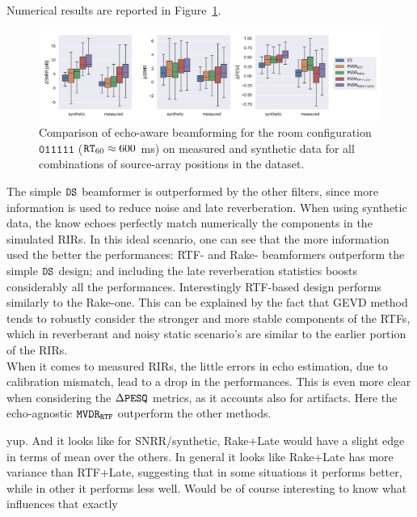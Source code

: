 Numerical results are reported in Figure~\ref{fig:dechorateapp:se:results}.
\begin{figure}[h]
    \begin{fullwidth}
        \centering
        \includegraphics[trim={0 10 10 0},clip,width=\linewidth]{figures/dechorate/kowalkzy_results_boxplot.pdf}
        \caption{
        Comparison of echo-aware beamforming for the room configuration $\mathtt{011111}$ ($\mathtt{RT}_{60} \approx 600 $ ms) on measured and synthetic data  for all combinations of source-array positions in the \dEchorate{} dataset.}
        \label{fig:dechorateapp:se:results}
    \end{fullwidth}
\end{figure}
The simple $\mathtt{DS}$ beamformer is outperformed by the other filters, since more information is used to reduce noise and late reverberation.
When using synthetic data, the know echoes perfectly match numerically the components in the simulated RIRs. In this ideal scenario, one can see that the more information used the better the performances: RTF- and Rake- beamformers outperform the simple $\mathtt{DS}$ design; and including the late reverberation statistics boosts considerably all the performances.
Interestingly RTF-based design performs similarly to the Rake-one. This can be explained by the fact that GEVD method tends to robustly consider the stronger and more stable components of the RTFs, which in reverberant and noisy static scenario's are similar to the earlier portion of the RIRs.
\\When it comes to measured RIRs, the little errors in echo estimation, due to calibration mismatch, lead to a drop in the performances. This is even more clear when considering the $\Delta\mathtt{PESQ}$ metrics, as it accounts also for artifacts. Here the echo-agnostic $\mathtt{MVDR}_\mathtt{RTF}$ outperform the other methods.

yup. And it looks like for SNRR/synthetic, Rake+Late would have a slight edge in terms of mean over the others. In general it looks like Rake+Late has more variance than RTF+Late, suggesting that in some situations it performs better, while in other it performs less well. Would be of course interesting to know what influences that exactly

